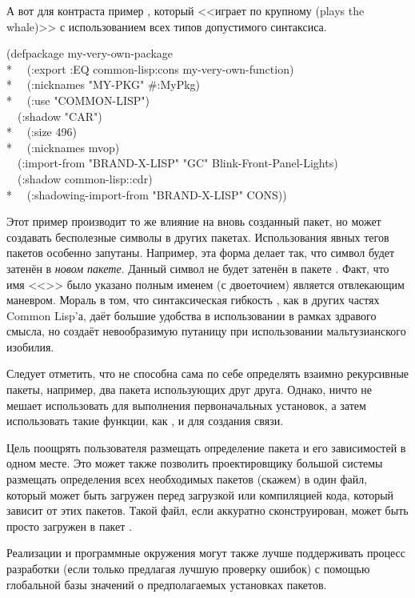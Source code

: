 \begin{defun}[Переменная]
\begin{defmac}
А вот для контраста пример , который <<играет по крупному (plays
the whale)>> с использованием всех типов допустимого синтаксиса.
\begin{lisp}
(defpackage my-very-own-package \\*
~~(:export :EQ common-lisp:cons my-very-own-function) \\*
~~(:nicknames "MY-PKG" \#:MyPkg) \\*
~~(:use "COMMON-LISP") \\
~~(:shadow "CAR") \\*
~~(:size 496) \\*
~~(:nicknames mvop) \\
~~(:import-from "BRAND-X-LISP" "GC" Blink-Front-Panel-Lights) \\
~~(:shadow common-lisp::cdr) \\*
~~(:shadowing-import-from "BRAND-X-LISP" CONS))
\end{lisp}
Этот пример производит то же влияние на вновь созданный пакет,  но может
создавать бесполезные символы в других пакетах.
Использования явных тегов пакетов особенно запутаны.
Например, эта форма  делает так, что символ  будет
затенён в \emph{новом пакете}. Данный символ не будет затенён в пакете
. Факт, что имя <<>> было указано полным именем (с
двоеточием) является отвлекающим маневром.
Мораль в том, что синтаксическая гибкость , как в других частях
Common Lisp'а, даёт большие удобства в использовании в рамках здравого смысла, 
но создаёт невообразимую путаницу при использовании мальтузианского изобилия.

Следует отметить, что  не способна сама по себе определять
взаимно рекурсивные пакеты, например, два пакета использующих друг друга. Однако,
ничто не мешает использовать  для выполнения первоначальных
установок, а затем использовать такие функции, как ,
 и  для создания связи.

Цель  поощрять пользователя размещать определение пакета и его
зависимостей в одном месте. Это может также позволить проектировщику большой
системы размещать определения всех необходимых пакетов (скажем) в один файл,
который может быть загружен перед загрузкой или компиляцией кода, который
зависит от этих пакетов. Такой файл, если аккуратно сконструирован, может быть
просто загружен в пакет .

Реализации и программные окружения могут также лучше поддерживать процесс
разработки (если только предлагая лучшую проверку ошибок) с помощью глобальной
базы значений о предполагаемых установках пакетов.
\end{defmac}


\end{defun}
